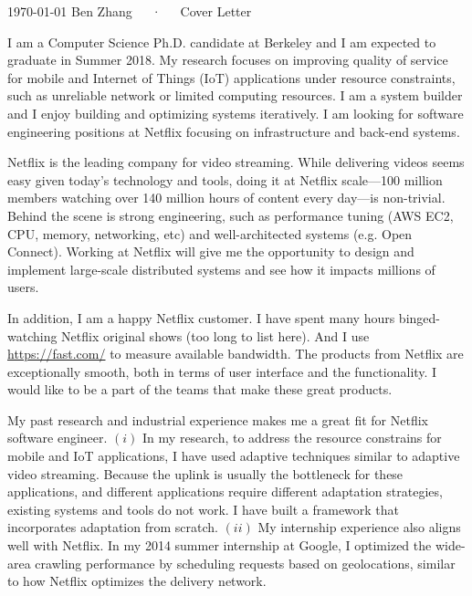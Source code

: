 \documentclass[11pt, letterpaper]{awesome-cv}
\begin{document}
\makecvheader[R]
\makecvfooter
  {\today}
  {Ben Zhang~~~·~~~Cover Letter}
  {}

\makelettertitle

\begin{cvletter}


  I am a Computer Science Ph.D. candidate at Berkeley and I am expected to
  graduate in Summer 2018. My research focuses on improving quality of service
  for mobile and Internet of Things (IoT) applications under resource
  constraints, such as unreliable network or limited computing resources. I am a
  system builder and I enjoy building and optimizing systems iteratively. I am
  looking for software engineering positions at Netflix focusing on
  infrastructure and back-end systems.


  Netflix is the leading company for video streaming. While delivering videos
  seems easy given today's technology and tools, doing it at Netflix scale---100
  million members watching over 140 million hours of content every day---is
  non-trivial. Behind the scene is strong engineering, such as performance
  tuning (AWS EC2, CPU, memory, networking, etc) and well-architected systems
  (e.g. Open Connect). Working at Netflix will give me the opportunity to design
  and implement large-scale distributed systems and see how it impacts millions
  of users.

  In addition, I am a happy Netflix customer. I have spent many hours
  binged-watching Netflix original shows (too long to list here). And I use
  \url{https://fast.com/} to measure available bandwidth. The products from
  Netflix are exceptionally smooth, both in terms of user interface and the
  functionality. I would like to be a part of the teams that make these great
  products.


  My past research and industrial experience makes me a great fit for Netflix
  software engineer. $(i)$ In my research, to address the resource constrains
  for mobile and IoT applications, I have used adaptive techniques similar to
  adaptive video streaming. Because the uplink is usually the bottleneck for
  these applications, and different applications require different adaptation
  strategies, existing systems and tools do not work. I have built a framework
  that incorporates adaptation from scratch. $(ii)$ My internship experience
  also aligns well with Netflix. In my 2014 summer internship at Google, I
  optimized the wide-area crawling performance by scheduling requests based on
  geolocations, similar to how Netflix optimizes the delivery network.


\end{cvletter}
\end{document}
